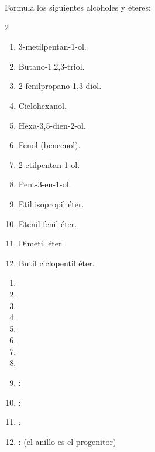 \begin{exercise}
    Formula los siguientes alcoholes y éteres:
    \begin{multicols}{2}
        \begin{enumerate}[label=\alph*)]
            \item 3-metilpentan-1-ol.
            \item Butano-1,2,3-triol.
            \item 2-fenilpropano-1,3-diol.
            \item Ciclohexanol.
            \item Hexa-3,5-dien-2-ol.
            \item Fenol (bencenol).
            \item 2-etilpentan-1-ol.
            \item Pent-3-en-1-ol.
            \item Etil isopropil éter.
            \item Etenil fenil éter.
            \item Dimetil éter.
            \item Butil ciclopentil éter.
        \end{enumerate}
    \end{multicols}
    \begin{solu}
        \begin{enumerate}[label=\alph*)]
            \item {}
            \item {}
            \item {}
            \item {}
            \item {}
            \item {}
            \item {}
            \item {}
            \item {}: 
            \item {}: 
            \item {}: 
            \item {}:  (el anillo es el progenitor)
        \end{enumerate}
    \end{solu}
\end{exercise}

